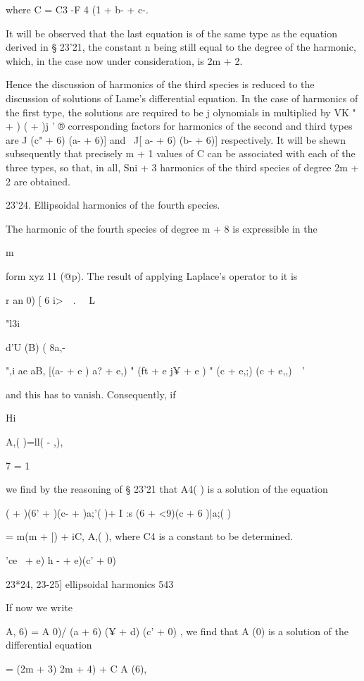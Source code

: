 {where C = C3 -F 4 (1 + b- + c-.

It will be observed that the last equation is of the same type as the
equation derived in § 23'21, the constant n being still equal to the
degree of the harmonic, which, in the case now under consideration, is
2m + 2.

Hence the discussion of harmonics of the third species is reduced to
the discussion of solutions of Lame's differential equation. In the
case of harmonics of the first type, the solutions are required to be
j olynomials in multiplied by VK " + ) ( + )j ' ® corresponding
factors for harmonics of the second and third types are J (c" + 6) (a-
+ 6)] and \ J[ a- + 6) (b- + 6)] respectively. It will be shewn
subsequently that precisely m + 1 values of C can be associated with
each of the three types, so that, in all, Sni + 3 harmonics of the
third species of degree 2m + 2 are obtained.

23'24. Ellipsoidal harmonics of the fourth species.

The harmonic of the fourth species of degree m + 8 is expressible in
the

m

form xyz 11 (@p). The result of applying Laplace's operator to it is

r an 0) [ 6 i>\ \ . \ \ L

"l3i %

  d'U (B) ( 8a,- \ %

",i ae aB, [(a- + e ) a? + e,) " (ft + e j¥ + e ) " (c + e,;) (c +
e,,)\ \ '

and this has to vanish. Consequently, if

Hi

A,( )=ll( - ,),

7 = 1

we find by the reasoning of § 23'21 that A4( ) is a solution of the
equation

( + )(6' + )(c- + )a;'( )+ I :s (6 + <9)(c + 6 )|a;( )

= m(m + |) + iC, A,( ), where C4 is a constant to be determined.

 'ce~ + e) h - + e)(c' + 0) ~

23*24, 23-25] ellipsoidal harmonics 543

If now we write

A, 6) = A 0)/ (a + 6) (¥ + d) (c' + 0) , we find that A (0) is a
solution of the differential equation

= (2m + 3) 2m + 4) + C A (6),

}
